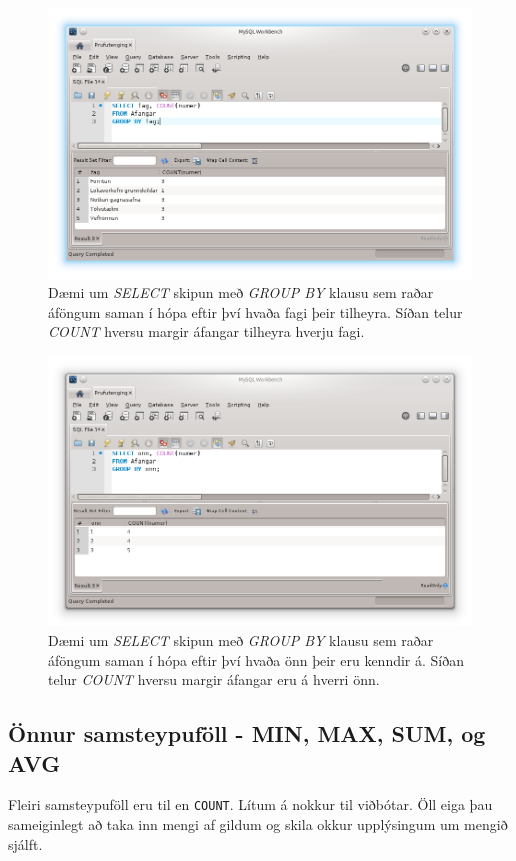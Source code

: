 \begin{figure}
\caption[GROUP BY og COUNT eftir fögum]{Dæmi um \emph{SELECT} skipun með \emph{GROUP BY} klausu sem raðar áföngum saman í hópa eftir því hvaða fagi þeir tilheyra. Síðan telur \emph{COUNT} hversu margir áfangar tilheyra hverju fagi.}
\label{mynd:workbench-group-by}
\centering
\includegraphics[width=\linewidth]{myndir/workbench-group-by}
\end{figure}

\begin{figure}
\caption[GROUP BY og COUNT eftir önnum]{Dæmi um \emph{SELECT} skipun með \emph{GROUP BY} klausu sem raðar áföngum saman í hópa eftir því hvaða önn þeir eru kenndir á. Síðan telur \emph{COUNT} hversu margir áfangar eru á hverri önn.}
\label{mynd:workbench-group-by-onn}
\centering
\includegraphics[width=\linewidth]{myndir/workbench-group-by-onn}
\end{figure}

\subsection{Önnur samsteypuföll - MIN, MAX, SUM, og AVG}
\label{undirkafli:onnur-samsteypufoll}
Fleiri samsteypuföll eru til en \verb|COUNT|. Lítum á nokkur til viðbótar. Öll eiga þau sameiginlegt að taka inn mengi af gildum og skila okkur upplýsingum um mengið sjálft.

